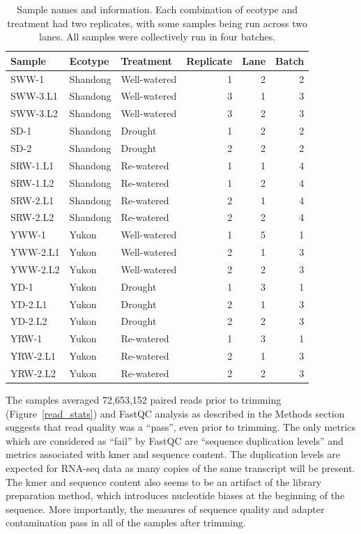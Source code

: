 \documentclass[12pt]{article}
\begin{document}
	\begin{table}[H]
		\centering
		\begin{tabular}{lllrrr}
			\toprule
			Sample & Ecotype & Treatment & Replicate & Lane & Batch\\
			\midrule
			\rowcolor{Gray}
			SWW-1 & Shandong & Well-watered & 1 & 2 & 2\\
			SWW-3.L1 & Shandong & Well-watered & 3 & 1 & 3\\
			SWW-3.L2 & Shandong & Well-watered & 3 & 2 & 3\\
			\rowcolor{Gray}
			SD-1 & Shandong & Drought & 1 & 2 & 2\\
			SD-2 & Shandong & Drought & 2 & 2 & 2\\
			\rowcolor{Gray}
			SRW-1.L1 & Shandong & Re-watered & 1 & 1 & 4\\
			\rowcolor{Gray}
			SRW-1.L2 & Shandong & Re-watered & 1 & 2 & 4\\
			SRW-2.L1 & Shandong & Re-watered & 2 & 1 & 4\\
			SRW-2.L2 & Shandong & Re-watered & 2 & 2 & 4\\
			\rowcolor{Gray}
			YWW-1 & Yukon & Well-watered & 1 & 5 & 1\\		
			YWW-2.L1 & Yukon & Well-watered & 2 & 1 & 3\\
			YWW-2.L2 & Yukon & Well-watered & 2 & 2 & 3\\
			\rowcolor{Gray}
			YD-1 & Yukon & Drought & 1 & 3 & 1\\
			YD-2.L1 & Yukon & Drought & 2 & 1 & 3\\
			YD-2.L2 & Yukon & Drought & 2 & 2 & 3\\
			\rowcolor{Gray}
			YRW-1 & Yukon & Re-watered & 1 & 3 & 1\\
			YRW-2.L1 & Yukon & Re-watered & 2 & 1 & 3\\
			YRW-2.L2 & Yukon & Re-watered & 2 & 2 & 3\\

	
			\bottomrule
		\end{tabular}
		\caption[Sample Names and Information]{Sample names and information. Each combination of ecotype and treatment had two replicates, with some samples being run across two lanes. All samples were collectively run in four batches.}
		\label{table:samples}
	\end{table}
	
	The samples averaged 72,653,152 paired reads prior to trimming (Figure~\ref{read_stats}) and FastQC analysis as described in the Methods section suggests that read quality was a ``pass'', even prior to trimming. The only metrics which are considered as ``fail'' by FastQC are ``sequence duplication levels'' and metrics associated with kmer and sequence content. The duplication levels are expected for RNA-seq data as many copies of the same transcript will be present. The kmer and sequence content also seems to be an artifact of the library preparation method, which introduces nucleotide biases at the beginning of the sequence. More importantly, the  measures of sequence quality and adapter contamination pass in all of the samples after trimming.
	
\end{document}
